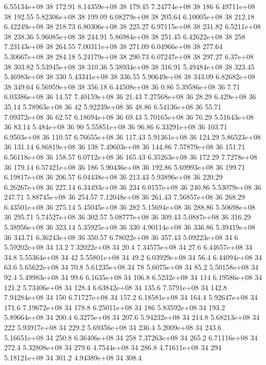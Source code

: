 6.55134e+08 38 172.91
8.14359e+08 38 179.45
7.24774e+08 38 186
6.49711e+08 38 192.55
5.82306e+08 38 199.09
6.08279e+08 38 205.64
6.10005e+08 38 212.18
6.42249e+08 38 218.73
6.80306e+08 38 225.27
6.97115e+08 38 231.82
6.5211e+08 38 238.36
5.96085e+08 38 244.91
5.86984e+08 38 251.45
6.42622e+08 38 258
7.23143e+08 38 264.55
7.00311e+08 38 271.09
6.04966e+08 38 277.64
5.30667e+08 38 284.18
5.24179e+08 38 290.73
6.07247e+08 38 297.27
6.37e+08 38 303.82
5.53945e+08 38 310.36
5.38934e+08 38 316.91
5.49484e+08 38 323.45
5.46983e+08 38 330
5.43341e+08 38 336.55
5.90649e+08 38 343.09
6.82682e+08 38 349.64
6.56959e+08 38 356.18
6.44508e+08 36 0.86
5.39586e+08 36 7.71
6.03386e+08 36 14.57
7.40159e+08 36 21.43
7.27568e+08 36 28.29
6.429e+08 36 35.14
5.78963e+08 36 42
5.92239e+08 36 48.86
6.54136e+08 36 55.71
7.09372e+08 36 62.57
6.18694e+08 36 69.43
5.70165e+08 36 76.29
5.51643e+08 36 83.14
5.484e+08 36 90
5.55851e+08 36 96.86
6.33291e+08 36 103.71
6.9503e+08 36 110.57
6.76655e+08 36 117.43
5.91361e+08 36 124.29
5.86523e+08 36 131.14
6.86819e+08 36 138
7.49603e+08 36 144.86
7.57879e+08 36 151.71
6.56118e+08 36 158.57
6.0712e+08 36 165.43
6.35263e+08 36 172.29
7.7278e+08 36 179.14
6.57421e+08 36 186
5.90436e+08 36 192.86
5.69993e+08 36 199.71
6.19817e+08 36 206.57
6.04438e+08 36 213.43
5.93896e+08 36 220.29
6.26267e+08 36 227.14
6.34493e+08 36 234
6.0157e+08 36 240.86
5.53079e+08 36 247.71
5.88745e+08 36 254.57
7.12048e+08 36 261.43
7.56857e+08 36 268.29
6.43501e+08 36 275.14
5.45045e+08 36 282
5.15694e+08 36 288.86
5.50698e+08 36 295.71
5.74527e+08 36 302.57
5.08777e+08 36 309.43
5.0887e+08 36 316.29
5.38956e+08 36 323.14
5.35925e+08 36 330
4.90114e+08 36 336.86
5.39419e+08 36 343.71
6.36243e+08 36 350.57
6.78022e+08 36 357.43
5.09223e+08 34 6
5.59202e+08 34 13.2
7.32022e+08 34 20.4
7.34575e+08 34 27.6
6.44657e+08 34 34.8
5.55364e+08 34 42
5.55801e+08 34 49.2
6.03929e+08 34 56.4
6.44094e+08 34 63.6
5.65622e+08 34 70.8
5.61235e+08 34 78
5.6075e+08 34 85.2
5.50158e+08 34 92.4
5.49983e+08 34 99.6
6.1635e+08 34 106.8
6.5232e+08 34 114
6.19586e+08 34 121.2
5.73406e+08 34 128.4
6.63842e+08 34 135.6
7.5791e+08 34 142.8
7.94284e+08 34 150
6.71727e+08 34 157.2
6.18581e+08 34 164.4
5.92647e+08 34 171.6
7.19672e+08 34 178.8
6.25011e+08 34 186
5.83592e+08 34 193.2
5.89664e+08 34 200.4
6.3275e+08 34 207.6
5.94232e+08 34 214.8
5.68213e+08 34 222
5.93917e+08 34 229.2
5.69356e+08 34 236.4
5.2009e+08 34 243.6
5.16651e+08 34 250.8
6.36406e+08 34 258
7.37263e+08 34 265.2
6.71116e+08 34 272.4
5.32808e+08 34 279.6
4.7544e+08 34 286.8
4.71611e+08 34 294
5.18121e+08 34 301.2
4.94389e+08 34 308.4
